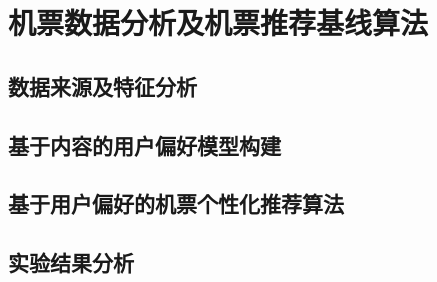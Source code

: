 
\chapter{机票数据分析及机票推荐基线算法}
\label{chap:baseline}

\section{数据来源及特征分析}

\section{基于内容的用户偏好模型构建}

\section{基于用户偏好的机票个性化推荐算法}

\section{实验结果分析}